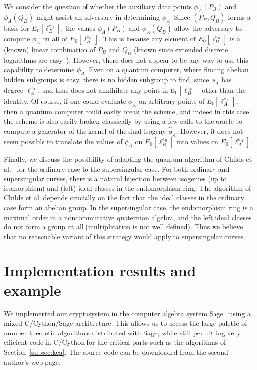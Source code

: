 \documentclass[envcountsect,envcountsame,runningheads]{llncs}   %
\begin{document}
We consider the question of whether the auxiliary data points
$\phi_A(P_B)$ and $\phi_A(Q_B)$ might assist an adversary in
determining $\phi_A$. Since $(P_B,Q_B)$ forms a basis for
$E_0[\ell_B^{e_B}]$, the values $\phi_A(P_B)$ and $\phi_A(Q_B)$ allow
the adversary to compute $\phi_A$ on all of $E_0[\ell_B^{e_B}]$. This
is because any element of $E_0[\ell_B^{e_B}]$ is a (known) linear
combination of $P_B$ and $Q_B$ (known since extended discrete
logarithms are easy~\cite{teske-ph}). However, there does not appear
to be any way to use this capability to determine $\phi_A$. Even on a
quantum computer, where finding abelian hidden subgroups is easy,
there is no hidden subgroup to find, since $\phi_A$ has degree
$\ell_A^{e_A}$, and thus does not annihilate any point in
$E_0[\ell_B^{e_B}]$ other than the identity. Of course, if one could
evaluate $\phi_A$ on arbitrary points of $E_0[\ell_A^{e_A}]$, then a
quantum computer could easily break the scheme, and indeed in this case the
scheme is also easily broken classically by using a few calls to the
oracle to compute a generator of the kernel of the dual isogeny 
$\hat{\phi}_A$. However, it does not seem possible to translate the values of
$\phi_A$ on $E_0[\ell_B^{e_B}]$ into values on $E_0[\ell_A^{e_A}]$.

Finally, we discuss the possibility of adapting the quantum algorithm
of Childs et al.~\cite{CJS} for the ordinary case to the supersingular
case. For both ordinary and supersingular curves, there is a natural
bijection between isogenies (up to isomorphism) and (left) ideal
classes in the endomorphism ring. The algorithm of Childs et
al. depends crucially on the fact that the ideal classes in the
ordinary case form an abelian group. In the supersingular case, the
endomorphism ring is a maximal order in a noncommutative quaternion
algebra, and the left ideal classes do not form a group at all
(multiplication is not well defined). Thus we believe that no
reasonable variant of this strategy would apply to supersingular
curves.

\section{Implementation results and example}\label{sec:imp}

We implemented our cryptosystem in the computer algebra system
Sage~\cite{Sage} using a mixed C/Cython/Sage architecture. This allows
us to access the large palette of number theoretic algorithms
distributed with Sage, while still permitting very efficient code in
C/Cython for the critical parts such as the algorithms of
Section~\ref{subsec:kea}. The source code can be downloaded from the
second author's web page.
\end{document}
